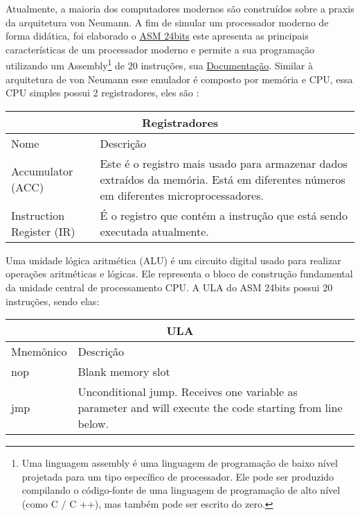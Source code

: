 Atualmente, a maioria dos computadores modernos são construídos sobre a praxis da arquitetura von Neumann. A fim de simular um processador moderno de forma didática, foi elaborado o \href{https://gzsig.io/vm-24bits/}{ASM 24bits} este apresenta as principais características de um processador moderno e permite a sua programação utilizando um Assembly\footnote{Uma linguagem assembly é uma linguagem de programação de baixo nível projetada para um tipo específico de processador. Ele pode ser produzido compilando o código-fonte de uma linguagem de programação de alto nível (como C / C ++), mas também pode ser escrito do zero.} de 20 instruções, sua \href{https://github.com/gzsig/Asm/blob/master/README.md}{Documentação}. Similar à arquitetura de von Neumann esse emulador é composto por memória e CPU, essa CPU simples possui 2 registradores, eles são :

\vspace{1cm}
\begin{longtable}{ |p{3cm}||p{11cm}|  }
  \hline
  \multicolumn{2}{|c|}{Registradores} \\
  \hline
    Nome &
    Descrição\\
  \hline
    Accumulator (ACC) &Este é o registro mais usado para armazenar dados extraídos da memória. Está em diferentes números em diferentes microprocessadores.\\
  \hline
    Instruction Register (IR) &É o registro que contém a instrução que está sendo executada atualmente.\\
  \hline
\end{longtable}
\vspace{1cm}

Uma unidade lógica aritmética (ALU) é um circuito digital usado para realizar operações aritméticas e lógicas. Ele representa o bloco de construção fundamental da unidade central de processamento CPU. A ULA do ASM 24bits possui 20 instruções, sendo elas:

\vspace{1cm}
\begin{longtable}{ |p{3cm}||p{11cm}|  }
  \hline
  \multicolumn{2}{|c|}{ULA} \\
  \hline
  Mnemônico &
  Descrição\\
  \hline
  nop &
  Blank memory slot \\
  \hline
  jmp &
  Unconditional jump. Receives one variable as parameter and will execute the code starting from line below. \\
  \hline
\end{longtable}
\vspace{1cm}

